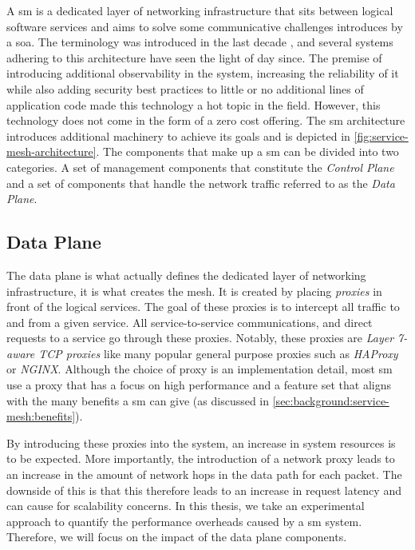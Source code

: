 A \gls{sm} is a dedicated layer of networking infrastructure that sits between logical software services and aims to solve some communicative challenges introduces by a \gls{soa}. The terminology was introduced in the last decade \cite{service-mesh-hype}, and several systems adhering to this architecture have seen the light of day since. The premise of introducing additional observability in the system, increasing the reliability of it while also adding security best practices to little or no additional lines of application code made this technology a hot topic in the field. However, this technology does not come in the form of a zero cost offering. The \gls{sm} architecture introduces additional machinery to achieve its goals and is depicted in \cref{fig:service-mesh-architecture}. The components that make up a \gls{sm} can be divided into two  categories. A set of management components that constitute the \textit{Control Plane} and a set of components that handle the network traffic referred to as the \textit{Data Plane}.

\subsection{Data Plane}
\label{sec:background:service-mesh:data-plane}

The data plane is what actually defines the dedicated layer of networking infrastructure, it is what creates the mesh. It is created by placing \textit{proxies} in front of the logical services. The goal of these proxies is to intercept all traffic to and from a given service. All service-to-service communications, and direct requests to a service go through these proxies. Notably, these proxies are \textit{Layer 7-aware TCP proxies} like many popular general purpose proxies such as \textit{HAProxy} or \textit{NGINX}. Although the choice of proxy is an implementation detail, most \gls{sm} use a proxy that has a focus on high performance and a feature set that aligns with the many benefits a \gls{sm} can give (as discussed in \cref{sec:background:service-mesh:benefits}).

By introducing these proxies into the system, an increase in system resources is to be expected. More importantly, the introduction of a network proxy leads to an increase in the amount of network hops in the data path for each packet. The downside of this is that this therefore leads to an increase in request latency and can cause for scalability concerns. In this thesis, we take an experimental approach to quantify the performance overheads caused by a \gls{sm} system. Therefore, we will focus on the impact of the data plane components.



